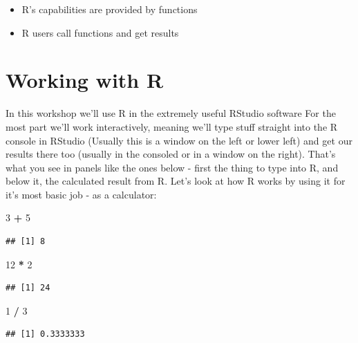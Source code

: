 \documentclass[
]{book}
\newenvironment{Shaded}{\begin{snugshade}}{\end{snugshade}}
\newcommand{\DecValTok}[1]{\textcolor[rgb]{0.00,0.00,0.81}{#1}}
\newcommand{\OperatorTok}[1]{\textcolor[rgb]{0.81,0.36,0.00}{\textbf{#1}}}
\newcommand{\StringTok}[1]{\textcolor[rgb]{0.31,0.60,0.02}{#1}}
\providecommand{\tightlist}{%
  \setlength{\itemsep}{0pt}\setlength{\parskip}{0pt}}
\begin{document}
\begin{itemize}
\tightlist
\item
  R's capabilities are provided by functions
\item
  R users call functions and get results
\end{itemize}

\hypertarget{working-with-r}{%
\section{Working with R}\label{working-with-r}}

In this workshop we'll use R in the extremely useful RStudio software For the most part we'll work interactively, meaning we'll type stuff straight into the R console in RStudio (Usually this is a window on the left or lower left) and get our results there too (usually in the consoled or in a window on the right). That's what you see in panels like the ones below - first the thing to type into R, and below it, the calculated result from R. Let's look at how R works by using it for it's most basic job - as a calculator:

\begin{Shaded}
\begin{Highlighting}[]
 \DecValTok{3} \OperatorTok{+}\StringTok{ }\DecValTok{5}
\end{Highlighting}
\end{Shaded}

\begin{verbatim}
## [1] 8
\end{verbatim}

\begin{Shaded}
\begin{Highlighting}[]
 \DecValTok{12} \OperatorTok{*}\StringTok{ }\DecValTok{2}
\end{Highlighting}
\end{Shaded}

\begin{verbatim}
## [1] 24
\end{verbatim}

\begin{Shaded}
\begin{Highlighting}[]
 \DecValTok{1} \OperatorTok{/}\StringTok{ }\DecValTok{3}
\end{Highlighting}
\end{Shaded}

\begin{verbatim}
## [1] 0.3333333
\end{verbatim}
\end{document}
